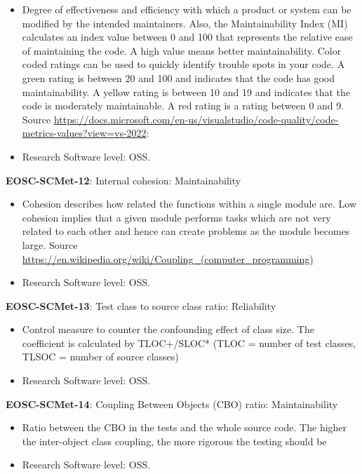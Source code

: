 \begin{itemize}
    \item Degree of effectiveness and efficiency with which a product or system can be modified by the intended
maintainers. Also, the Maintainability Index (MI) calculates an index value between 0 and 100 that represents the relative ease of maintaining the code. A high value means better maintainability. Color coded ratings can be used to quickly identify trouble spots in your code. A green rating is between 20 and 100 and indicates that the code has good maintainability. A yellow rating is between 10 and 19 and indicates that the code is moderately maintainable. A red rating is a rating between 0 and 9. Source \url{https://docs.microsoft.com/en-us/visualstudio/code-quality/code-metrics-values?view=vs-2022}:  \cite{iso_25010_2011_2017,montagud_systematic_2012}
    \item Research Software level: OSS.
\end{itemize}

\textbf{EOSC-SCMet-12}: Internal cohesion: Maintainability

\begin{itemize}
    \item Cohesion describes how related the functions within a single module are. Low cohesion implies that a given module performs tasks which are not very related to each other and hence can create problems as the module becomes large. Source \url{https://en.wikipedia.org/wiki/Coupling_(computer_programming)} \cite{iso_central_secretary_isoiecieee_2010,montagud_systematic_2012}
    \item Research Software level: OSS.
\end{itemize}

\textbf{EOSC-SCMet-13}: Test class to source class ratio: Reliability

\begin{itemize}
    \item Control measure to counter the confounding effect of class size. The coefficient is calculated by TLOC+/SLOC*  (TLOC = number of test classes, TLSOC = number of source classes) \cite{nagappan_early_2005}
    \item Research Software level: OSS.
\end{itemize}

\textbf{EOSC-SCMet-14}: Coupling Between Objects (CBO) ratio: Maintainability

\begin{itemize}
    \item Ratio between the CBO in the tests and the whole source code. The higher the inter-object class coupling, the more rigorous the testing should be \cite{nagappan_early_2005}
    \item Research Software level: OSS.
\end{itemize}


